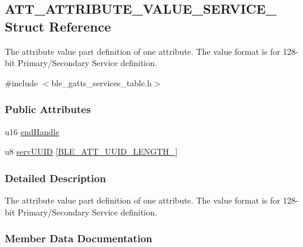 \hypertarget{struct_a_t_t___a_t_t_r_i_b_u_t_e___v_a_l_u_e___s_e_r_v_i_c_e__16}{}\subsection{A\+T\+T\+\_\+\+A\+T\+T\+R\+I\+B\+U\+T\+E\+\_\+\+V\+A\+L\+U\+E\+\_\+\+S\+E\+R\+V\+I\+C\+E\+\_ Struct Reference}
\label{struct_a_t_t___a_t_t_r_i_b_u_t_e___v_a_l_u_e___s_e_r_v_i_c_e__16}


The attribute value part definition of one attribute. The value format is for 128-\/bit Primary/\+Secondary Service definition.  




{\ttfamily \#include $<$ble\+\_\+gatts\+\_\+services\+\_\+table.\+h$>$}

\subsubsection*{Public Attributes}
\begin{DoxyCompactItemize}
\item 
u16 \hyperlink{struct_a_t_t___a_t_t_r_i_b_u_t_e___v_a_l_u_e___s_e_r_v_i_c_e__16_acfe1b006dd1bb2e377891178b931fbe2}{end\+Handle}
\item 
u8 \hyperlink{struct_a_t_t___a_t_t_r_i_b_u_t_e___v_a_l_u_e___s_e_r_v_i_c_e__16_afeb4c4ef4af5be4330a4825e2f499230}{serv\+U\+U\+ID} \mbox{[}\hyperlink{group___b_l_e___a_t_t___u_u_i_d___l_e_n_g_t_h___t_y_p_e_s_ga5a9cf4995e35a99b93e317eb81288e72}{B\+L\+E\+\_\+\+A\+T\+T\+\_\+\+U\+U\+I\+D\+\_\+\+L\+E\+N\+G\+T\+H\+\_}\mbox{]}
\end{DoxyCompactItemize}


\subsubsection{Detailed Description}
The attribute value part definition of one attribute. The value format is for 128-\/bit Primary/\+Secondary Service definition. 

\subsubsection{Member Data Documentation}
